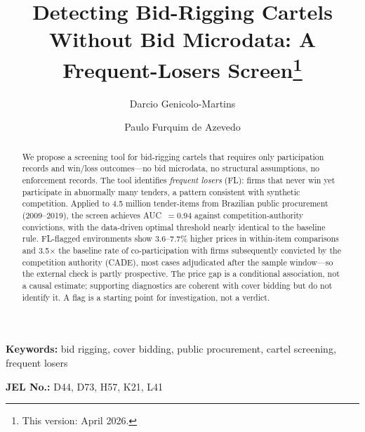 \begin{frontmatter}

\title{Detecting Bid-Rigging Cartels Without Bid Microdata: A Frequent-Losers Screen\texorpdfstring{\footnote{This version: April 2026.}}{}}

\author[insper]{Darcio Genicolo-Martins}
\author[insper]{Paulo Furquim de Azevedo}

\begin{abstract}
We propose a screening tool for bid-rigging cartels that requires
only participation records and win/loss outcomes---no bid microdata,
no structural assumptions, no enforcement records. The tool identifies
\emph{frequent losers} (FL): firms that never win yet participate in
abnormally many tenders, a pattern consistent with synthetic
competition. Applied to 4.5 million tender-items from Brazilian public
procurement (2009--2019), the screen achieves AUC~$= 0.94$ against
competition-authority convictions, with the data-driven optimal
threshold nearly identical to the baseline rule. FL-flagged
environments show 3.6--7.7\% higher prices in within-item
comparisons and 3.5$\times$ the baseline rate of co-participation
with firms subsequently convicted by the competition authority
(CADE), most cases adjudicated after the sample window---so the
external check is partly prospective. The price gap is a conditional association,
not a causal estimate; supporting diagnostics are coherent with cover
bidding but do not identify it. A flag is a starting point for
investigation, not a verdict.
\end{abstract}

\end{frontmatter}

\noindent\textbf{Keywords:} bid rigging, cover bidding, public procurement, cartel screening, frequent losers

\noindent\textbf{JEL No.:} D44, D73, H57, K21, L41

\bigskip
